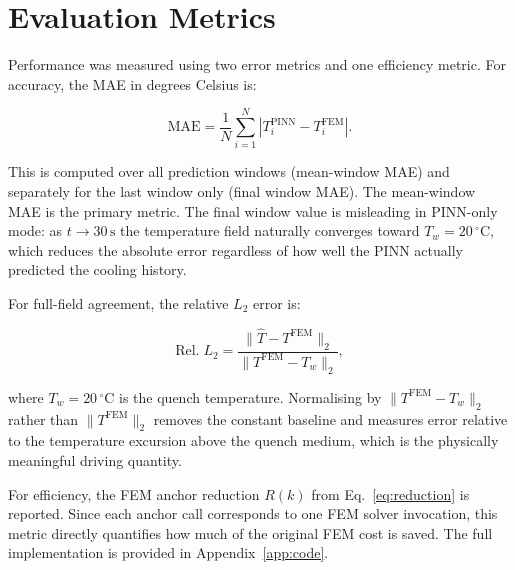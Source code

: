 \section{Evaluation Metrics}
\label{sec:metrics}

Performance was measured using two error metrics and one efficiency metric.
For accuracy, the MAE in degrees Celsius is:

\begin{equation}
\mathrm{MAE} = \frac{1}{N}\sum_{i=1}^N |T_i^\mathrm{PINN} - T_i^\mathrm{FEM}|.
\label{eq:mae}
\end{equation}

This is computed over all prediction windows (mean-window MAE) and separately
for the last window only (final window MAE).
The mean-window MAE is the primary metric.
The final window value is misleading in PINN-only mode: as $t\to30\,\mathrm{s}$
the temperature field naturally converges toward $T_w=20\,^\circ\mathrm{C}$,
which reduces the absolute error regardless of how well the PINN actually
predicted the cooling history.

For full-field agreement, the relative $L_2$ error is:

\begin{equation}
\mathrm{Rel.}\;L_2
= \frac{\|\hat{T}-T^\mathrm{FEM}\|_2}{\|T^\mathrm{FEM}-T_w\|_2},
\label{eq:l2}
\end{equation}

where $T_w = 20\,^\circ\mathrm{C}$ is the quench temperature.
Normalising by $\|T^\mathrm{FEM}-T_w\|_2$ rather than $\|T^\mathrm{FEM}\|_2$
removes the constant baseline and measures error relative to the temperature
excursion above the quench medium, which is the physically meaningful driving
quantity.

For efficiency, the FEM anchor reduction $R(k)$ from
Eq.~\eqref{eq:reduction} is reported.
Since each anchor call corresponds to one FEM solver invocation, this metric
directly quantifies how much of the original FEM cost is saved.
The full implementation is provided in Appendix~\ref{app:code}.
